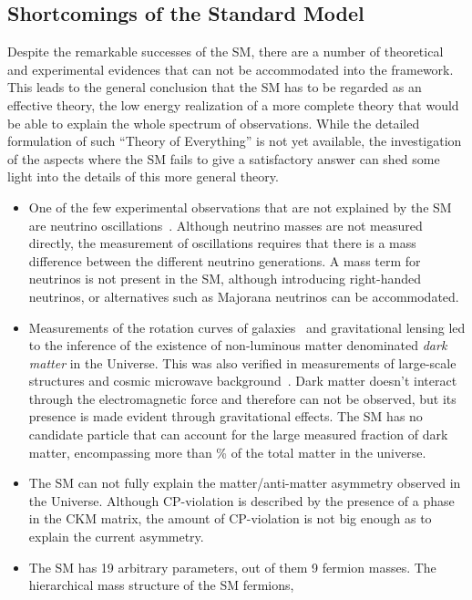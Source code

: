 \subsection{Shortcomings of the Standard Model}
\label{subsec:shortcomings}
Despite the remarkable successes of the SM, there are a number of theoretical and experimental evidences that can not be accommodated into the framework.
This leads to the general conclusion that the SM has to be regarded as an effective theory, the low energy realization of a more complete theory that would be able to explain the whole spectrum of observations. While the detailed formulation of such ``Theory of Everything'' is not yet available, the investigation of the aspects where the SM fails to give a satisfactory answer can shed some light into the details of this more general theory.
\begin{itemize}
  \item One of the few experimental observations that are not explained by the SM are neutrino oscillations~\cite{Fukuda:1998mi}. Although neutrino masses are not measured directly, the measurement of oscillations requires that there is a mass difference between the different neutrino generations. A mass term for neutrinos is not present in the SM, although introducing right-handed neutrinos, or alternatives such as Majorana neutrinos can be accommodated.
  \item Measurements of the rotation curves of galaxies~\cite{Begeman:1991iy} and gravitational lensing led to the inference of the existence of non-luminous matter denominated \textit{dark matter} in the Universe.
    This was also verified in measurements of large-scale structures and cosmic microwave background~\cite{Larson:2010gs,Ade:2013zuv}.
    Dark matter doesn't interact through the electromagnetic force and therefore can not be observed, but its presence is made evident through gravitational effects. The SM has no candidate particle that can account for the large measured fraction of dark matter, encompassing more than \unit[80]{\%} of the total matter in the universe.
  \item %
    The SM can not fully explain the matter/anti-matter asymmetry observed in the Universe. Although CP-violation is described by the presence of a phase in the CKM matrix, the amount of CP-violation is not big enough as to explain the current asymmetry.
  \item The SM has 19 arbitrary parameters, out of them 9 fermion masses. The hierarchical mass structure of the SM fermions, 

\end{itemize}
